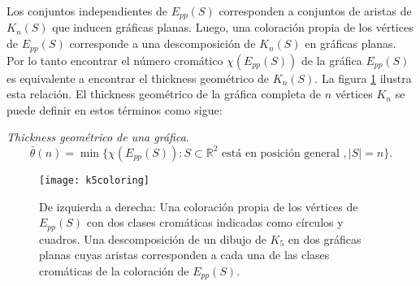 Los conjuntos independientes de $E_{pp}(S)$ corresponden a conjuntos de aristas de $K_n(S)$
que inducen gráficas planas. Luego, una coloración propia de los vértices de $E_{pp}(S)$
corresponde a una descomposición de $K_n(S)$ en gráficas planas.
Por lo tanto encontrar el número cromático $\chi(E_{pp}(S))$ de la gráfica
$E_{pp}(S)$ es equivalente a encontrar el thickness geométrico de $K_n(S)$.
La figura \ref{fig:k5coloring} ilustra esta relación.
El thickness geométrico de la gráfica completa de $n$ vértices $K_n$ se puede
definir en estos términos como sigue:
\begin{definition}{\emph{Thickness geométrico de una gráfica}.}
  \[\bar{\theta}(n) = \min\{ \chi(E_{pp}(S)): S \subset \mathbb{R}^2 \text{ está en posición general }, |S|=n \}.\]
\end{definition}
\begin{figure}
  \centering
  \texttt{[image: k5coloring]}
  \caption{De izquierda a derecha: Una coloración propia de los vértices de $E_{pp}(S)$ con dos
  clases cromáticas indicadas como círculos y cuadros.
  Una descomposición de un dibujo de $K_5$ en dos gráficas planas
  cuyas aristas corresponden a cada una de las clases cromáticas de la coloración
  de $E_{pp}(S)$.}
  \label{fig:k5coloring}
\end{figure}




